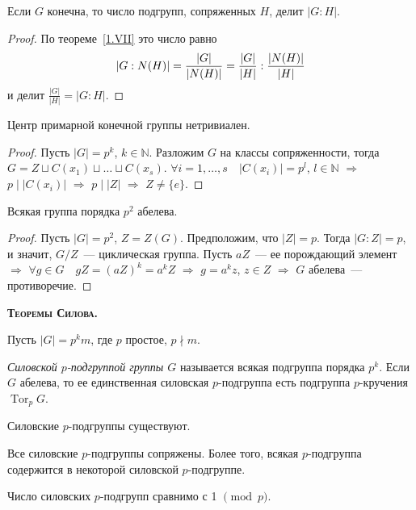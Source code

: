 \documentclass[a4paper]{article}
\newcommand*{\tema}[1]{\vspace{20pt}
\begin{center}{\textbf{\textsc{#1.}}}\vspace{5pt}
\end{center}}
\newcommand{\Tor}{\mathop{\mathrm{Tor}}\nolimits}
\newcommand*{\p}[1]{#1\nobreak\discretionary{}{\hbox{$\mathsurround=0pt #1$}}{}}
\begin{document}
\begin{theorem}
Если $G$ конечна, то число подгрупп, сопряженных $H$, делит $|G:H|$.
\end{theorem}

\begin{proof}
По теореме~\ref{1.VII} это число равно
$$|G:N(H)|=\frac{|G|}{|N(H)|}\p=\frac{|G|}{|H|}:\frac{|N(H)|}{|H|}$$ и
делит $\frac{|G|}{|H|}=|G:H|$.
\end{proof}

\begin{theorem}
Центр примарной конечной группы нетривиален.
\end{theorem}

\begin{proof}
Пусть $|G|=p^k$, $k\in \mathbb{N}$. Разложим $G$ на классы
сопряженности, тогда $G=Z\sqcup C(x_1)\sqcup\ldots\sqcup C(x_s)$.
$\forall i=1,\ldots,s\quad |C(x_i)|=p^l$, $l\in \mathbb{N}$
$\Rightarrow$ $p\mid |C(x_i)|$ $\Rightarrow$ $p\mid |Z|$
$\Rightarrow$ $Z\neq\{e\}$.
\end{proof}

\begin{sled}
Всякая группа порядка $p^2$ абелева.
\end{sled}

\begin{proof}
Пусть $|G|=p^2$, $Z=Z(G)$. Предположим, что $|Z|=p$. Тогда
$|G:Z|=p$, и значит, $G/Z$~--- циклическая группа. Пусть $aZ$~--- ее
порождающий элемент $\Rightarrow$ $\forall g\in G\quad
gZ=(aZ)^k=a^kZ$ $\Rightarrow$ $g=a^kz$, $z\in Z$ $\Rightarrow$ $G$
абелева~--- противоречие.
\end{proof}

\tema{Теоремы Силова}

Пусть $|G|=p^km$, где $p$ простое, $p\nmid m$.

\emph{Силовской $p$-подгруппой группы $G$} называется всякая
подгруппа порядка $p^k$. Если $G$ абелева, то ее единственная
силовская $p$-подгруппа есть подгруппа $p$-кручения $\Tor_pG$.

\begin{theorem}
\label{4.VII} Силовские $p$-подгруппы существуют.
\end{theorem}

\begin{theorem}
\label{5.VII} Все силовские $p$-подгруппы сопряжены. Более того,
всякая $p$-подгруппа содержится в некоторой силовской $p$-подгруппе.
\end{theorem}

\begin{theorem}
\label{6.VII} Число силовских $p$-подгрупп сравнимо с 1 $\pmod{p}$.
\end{theorem}
\end{document}
